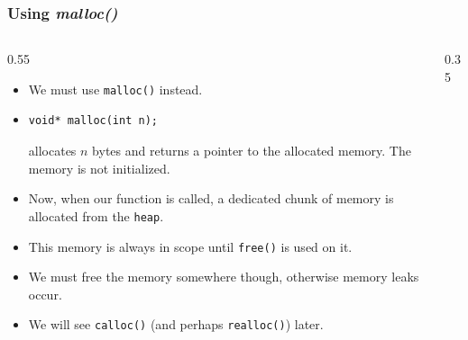 
\begin{frame}[fragile]
\frametitle{Using {\em malloc()}}
\begin{columns}[T]

\begin{column}{0.55\textwidth}
\begin{itemize}[<+->]
\item We must use \verb^malloc()^ instead.
\item
\begin{verbatim}
void* malloc(int n);
\end{verbatim}
allocates $n$ bytes and returns a pointer to the allocated
memory. The memory is  not initialized.
\item Now, when our function is called, a dedicated chunk of memory is allocated
from the \verb^heap^.
\item This memory is always in scope until \verb^free()^ is used on it.
\item We must free the memory somewhere though, otherwise memory leaks occur.
\item We will see \verb^calloc()^ (and perhaps \verb^realloc()^) later.
\end{itemize}
\end{column}

\pause
\begin{column}{0.35\textwidth}

\end{column}

\end{columns}
\end{frame}


